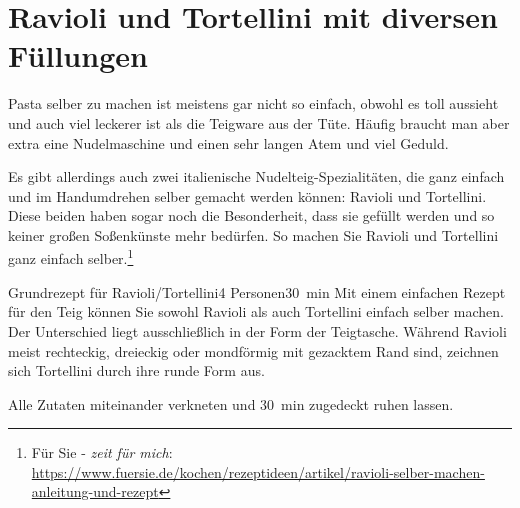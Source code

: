 \documentclass[a4paper, ngerman]{article}
\begin{document}
\section{Ravioli und Tortellini mit diversen Füllungen}
Pasta selber zu machen ist meistens gar nicht so einfach, obwohl es toll aussieht und auch viel leckerer ist als die Teigware aus der Tüte. Häufig braucht man aber extra eine Nudelmaschine und einen sehr langen Atem und viel Geduld.

Es gibt allerdings auch zwei italienische Nudelteig-Spezialitäten, die ganz einfach und im Handumdrehen selber gemacht werden können: Ravioli und Tortellini. Diese beiden haben sogar noch die Besonderheit, dass sie gefüllt werden und so keiner großen Soßenkünste mehr bedürfen. So machen Sie Ravioli und Tortellini ganz einfach selber.\footnote{Für Sie - \textit{zeit für mich}: \url{https://www.fuersie.de/kochen/rezeptideen/artikel/ravioli-selber-machen-anleitung-und-rezept}}

\begin{recipe}{Grundrezept für Ravioli/Tortellini}{4 Personen}{\SI{30}{\minute}}
    \freeform Mit einem einfachen Rezept für den Teig können Sie sowohl Ravioli als auch Tortellini einfach selber machen. Der Unterschied liegt ausschließlich in der Form der Teigtasche. Während Ravioli meist rechteckig, dreieckig oder mondförmig mit gezacktem Rand sind, zeichnen sich Tortellini durch ihre runde Form aus.

    Alle Zutaten miteinander verkneten und \SI{30}{\minute} zugedeckt ruhen lassen.
    \freeform\hrulefill
\end{recipe}
\end{document}
